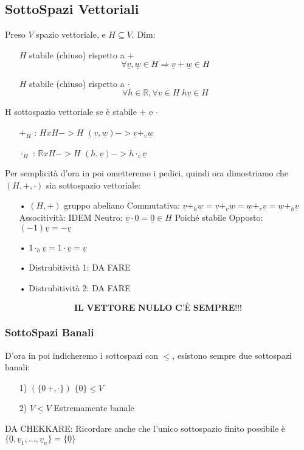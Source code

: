 \subsection{SottoSpazi Vettoriali}
Preso $V$ spazio vettoriale, e $H \subseteq V$.
Dim: \\
\begin{itemize}
\item[] $H$ stabile (chiuso) rispetto a $+$ 
$$ \forall \underline{v},\underline{w} \in H \Rightarrow \underline{v}+\underline{w} \in H $$
\item[] $H$ stabile (chiuso) rispetto a $\cdot$
$$ \forall h \in \mathbb{R}, \forall \underline{v} \in H  \; h\underline{v} \in H$$ 
\end{itemize}
H sottospazio vettoriale se è stabile $+$ e $\cdot$
\begin{itemize}
\item[$+_H$]: $HxH -> H$ $(\underline{v}, \underline{w}) -> \underline{v} +_v \underline{w}$
\item[$\cdot_H$]: $\mathbb{R}xH -> H$ $(h, \underline{v}) -> h \cdot_v \underline{v}$ 
\end{itemize}
Per semplicità d'ora in poi ometteremo i pedici, quindi ora dimostriamo che $(H, +, \cdot)$ sia sottospazio vettoriale:
\begin{itemize}
\item[•] $(H,+)$ gruppo abeliano
	 \subitem Commutativa: $ \underline{v} +_h \underline{w} = \underline{v} +_v \underline{w} = \underline{w} +_v \underline{v} = \underline{w} +_h \underline{v} $
	 \subitem Associtività: IDEM
	 \subitem Neutro: $ \underline{v} \cdot 0 = \underline{0} \in H $ Poiché stabile
	 \subitem Opposto: $ (-1)\underline{v} = -\underline{v} $
\item[•] $1 \cdot_h \underline{v} = 1 \cdot \underline{v} = \underline{v}$
\item[•] Distrubitività 1: DA FARE
\item[•] Distrubitività 2: DA FARE
\end{itemize}
$$ \textbf{IL VETTORE NULLO C'È SEMPRE!!!}$$

\subsubsection{SottoSpazi Banali}
D'ora in poi indicheremo i sottospazi con $ \underline{<} $, esistono sempre due sottospazi banali:
\begin{itemize}
\item[1)] $(\{\underline{0}\, +, \cdot\})$  $\{\underline{0}\} \underline{<} V$
\item[2)] $ V \underline{<} V$ Estremamente banale
\end{itemize} 
DA CHEKKARE: Ricordare anche che l'unico sottospazio finito possibile è $ \{\underline{0}, \underline{v}_1,..., \underline{v}_n\} = \{\underline{0}\} $

